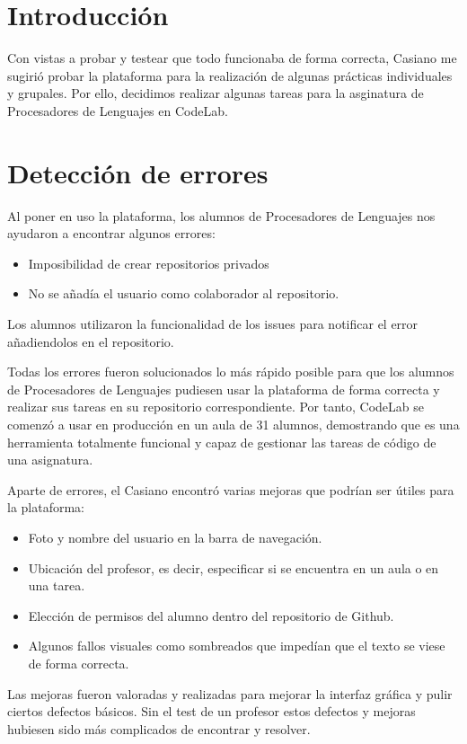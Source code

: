 
\section{Introducción}
\label{4:sec1}

Con vistas a probar y testear que todo funcionaba de forma correcta, Casiano me sugirió probar la plataforma para la realización de algunas prácticas individuales y grupales.
Por ello, decidimos realizar algunas tareas para la asginatura de Procesadores de Lenguajes en CodeLab.

\section{Detección de errores}
\label{4:sec2}

Al poner en uso la plataforma, los alumnos de Procesadores de Lenguajes nos ayudaron a encontrar algunos errores:

\begin{itemize}
    \item Imposibilidad de crear repositorios privados
    \item No se añadía el usuario como colaborador al repositorio.
\end{itemize}

Los alumnos utilizaron la funcionalidad de los issues para notificar el error añadiendolos en el repositorio.

Todas los errores fueron solucionados lo más rápido posible para que los alumnos de Procesadores de Lenguajes pudiesen usar la plataforma de forma correcta y realizar sus tareas en su repositorio correspondiente.
Por tanto, CodeLab se comenzó a usar en producción en un aula de 31 alumnos, demostrando que es una herramienta totalmente funcional y capaz de gestionar las tareas de código de una asignatura.

\newpage

Aparte de errores, el Casiano encontró varias mejoras que podrían ser útiles para la plataforma:

\begin{itemize}
    \item Foto y nombre del usuario en la barra de navegación.
    \item Ubicación del profesor, es decir, especificar si se encuentra en un aula o en una tarea.
    \item Elección de permisos del alumno dentro del repositorio de Github.
    \item Algunos fallos visuales como sombreados que impedían que el texto se viese de forma correcta.
\end{itemize}


Las mejoras fueron valoradas y realizadas para mejorar la interfaz gráfica y pulir ciertos defectos básicos.
Sin el test de un profesor estos defectos y mejoras hubiesen sido más complicados de encontrar y resolver.
